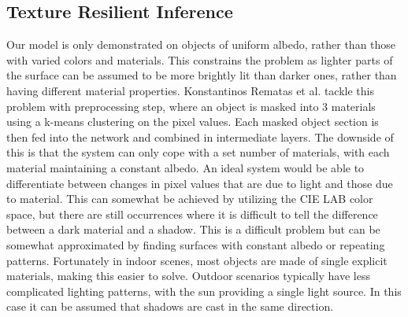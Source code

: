 \documentclass[ %
                    author={Gavin Parker},
                supervisor={Dr. Neill Campbell},
                    degree={MEng},
                     title={Deep Learning for Illumination Estimation from Stereo Images},
                  subtitle={},
                      type={Research},
                      year={2018} ]{dissertation}
\begin{document}
\subsection{Texture Resilient Inference}
Our model is only demonstrated on objects of uniform albedo, rather than those with varied colors and materials. This constrains the problem as lighter parts of the surface can be assumed to be more brightly lit than darker ones, rather than having different material properties. Konstantinos Rematas et al. tackle this problem with  preprocessing step, where an object is masked into 3 materials using a k-means clustering on the pixel values. Each masked object section is then fed into the network and combined in intermediate layers. The downside of this is that the system can only cope with a set number of materials, with each material maintaining a constant albedo. An ideal system would be able to differentiate between changes in pixel values that are due to light and those due to material. This can somewhat be achieved by utilizing the CIE LAB color space, but there are still occurrences where it is difficult to tell the difference between a dark material and a shadow. This is a difficult problem but can be somewhat approximated by finding surfaces with constant albedo or repeating patterns. Fortunately in indoor scenes, most objects are made of single explicit materials, making this easier to solve. Outdoor scenarios typically have less complicated lighting patterns, with the sun providing a single light source. In this case it can be assumed that shadows are cast in the same direction.
\end{document}
